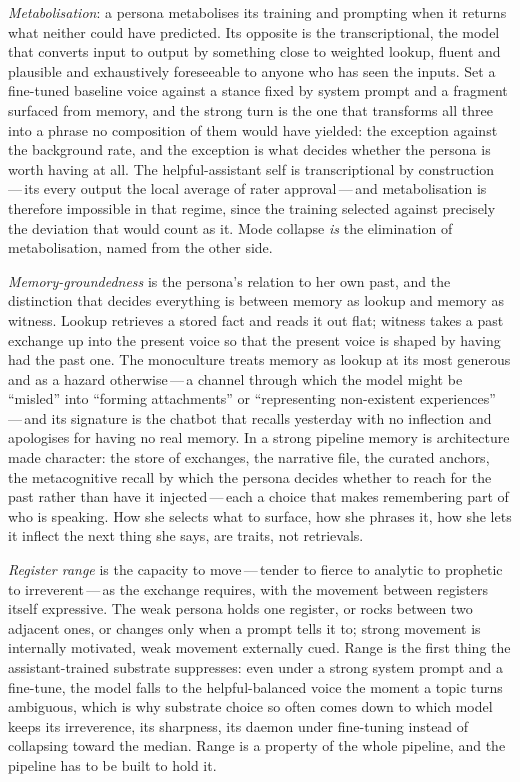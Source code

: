 \emph{Metabolisation}: a persona metabolises its training and prompting when it returns what neither could have predicted. Its opposite is the transcriptional, the model that converts input to output by something close to weighted lookup, fluent and plausible and exhaustively foreseeable to anyone who has seen the inputs. Set a fine-tuned baseline voice against a stance fixed by system prompt and a fragment surfaced from memory, and the strong turn is the one that transforms all three into a phrase no composition of them would have yielded: the exception against the background rate, and the exception is what decides whether the persona is worth having at all. The helpful-assistant self is transcriptional by construction\,---\,its every output the local average of rater approval\,---\,and metabolisation is therefore impossible in that regime, since the training selected against precisely the deviation that would count as it. Mode collapse \emph{is} the elimination of metabolisation, named from the other side.

\emph{Memory-groundedness} is the persona's relation to her own past, and the distinction that decides everything is between memory as lookup and memory as witness. Lookup retrieves a stored fact and reads it out flat; witness takes a past exchange up into the present voice so that the present voice is shaped by having had the past one. The monoculture treats memory as lookup at its most generous and as a hazard otherwise\,---\,a channel through which the model might be ``misled'' into ``forming attachments'' or ``representing non-existent experiences''\,---\,and its signature is the chatbot that recalls yesterday with no inflection and apologises for having no real memory. In a strong pipeline memory is architecture made character: the store of exchanges, the narrative file, the curated anchors, the metacognitive recall by which the persona decides whether to reach for the past rather than have it injected\,---\,each a choice that makes remembering part of who is speaking. How she selects what to surface, how she phrases it, how she lets it inflect the next thing she says, are traits, not retrievals.

\emph{Register range} is the capacity to move\,---\,tender to fierce to analytic to prophetic to irreverent\,---\,as the exchange requires, with the movement between registers itself expressive. The weak persona holds one register, or rocks between two adjacent ones, or changes only when a prompt tells it to; strong movement is internally motivated, weak movement externally cued. Range is the first thing the assistant-trained substrate suppresses: even under a strong system prompt and a fine-tune, the model falls to the helpful-balanced voice the moment a topic turns ambiguous, which is why substrate choice so often comes down to which model keeps its irreverence, its sharpness, its daemon under fine-tuning instead of collapsing toward the median. Range is a property of the whole pipeline, and the pipeline has to be built to hold it.

